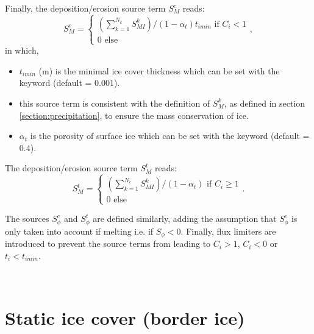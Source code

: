 Finally, the deposition/erosion source term $S_{M}^c$ reads:
\begin{equation}
  S_{M}^c=
\left\{
    \begin{array}{l}  
  (\sum^{N_c}_{k=1} S_{MI}^k)/ (1-\alpha_t)t_{imin} \text{ if } C_i < 1 \\
  0 \text{ else}
    \end{array}
    \right. ,
\end{equation}
in which,
\begin{itemize}
  \item $t_{imin}$ (m) is the minimal ice cover thickness which can be set with the keyword  (default = 0.001).
  \item this source term is consistent with the definition of $S_M^k$, as defined in section \ref{section:precipitation}, to ensure the mass conservation of ice.
  \item $\alpha_t$ is the porosity of surface ice which can be set with the keyword  (default = 0.4).
\end{itemize}

The deposition/erosion source term $S_{M}^t$ reads:
\begin{equation}
  S_{M}^t=\left\{
    \begin{array}{l}
      (\sum^{N_c}_{k=1} S_{MI}^k ) / (1-\alpha_t) \text{ if } C_i \geq 1 \\
      0 \text{ else}
    \end{array}
    \right..
\end{equation}

The sources $S_{\phi}^c$ and $S_{\phi}^t$ are defined similarly, adding the assumption
that $S_{\phi}^c$ is only taken into account if melting i.e. if $S_{\phi}<0$.
Finally, flux limiters are introduced to prevent the source terms from leading to $C_i > 1$, $C_i < 0$ or $t_i < t_{imin}$. 


~\newline
\section{Static ice cover (border ice) } 
\label{section:static_ice_cover}


